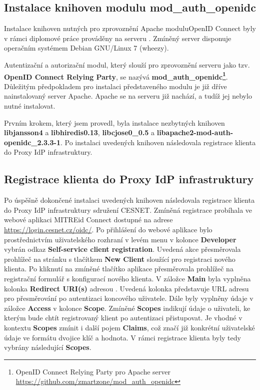 \documentclass[
  printed, %
  twoside, %
  table,   %
  nolof,     %
  nolot,     %
]{fithesis3}
\begin{document}
\label{apacheConfig}
\subsection{Instalace knihoven modulu mod\_auth\_openidc}
Instalace knihoven nutných pro zprovoznění Apache modulu\break OpenID Connect byly v rámci diplomové práce prováděny na serveru . Zmíněný server disponuje operačním systémem Debian GNU/Linux 7 (wheezy). 
\par 
Autentizační a autorizační modul, který slouží pro zprovoznění serveru jako tzv. \textbf{OpenID Connect Relying Party}, se nazývá \linebreak \textbf{mod\_auth\_openidc\footnote{OpenID Connect Relying Party pro Apache server \url{https://github.com/zmartzone/mod\_auth\_openidc}}}. Důležitým předpokladem pro instalaci představeného modulu je již dříve nainstalovaný server Apache. Apache se na serveru  již nachází, a tudíž jej nebylo nutné instalovat. 
\par 
Prvním krokem, který jsem provedl, byla instalace nezbytných knihoven \textbf{libjansson4} a \textbf{libhiredis0.13}, \textbf{libcjose0\_0.5} a \textbf{libapache2-mod-auth-openidc\_2.3.3-1}. Po instalaci uvedených knihoven následovala registrace klienta do Proxy IdP infrastruktury. 

\subsection{Registrace klienta do Proxy IdP infrastruktury}

Po úspěšně dokončené instalaci uvedených knihoven následovala registrace klienta  do Proxy IdP infrastruktury sdružení CESNET. Zmíněná registrace probíhala ve webové aplikaci MITREid Connect dostupné na adrese \url{https://login.cesnet.cz/oidc/}. Po přihlášení do webové aplikace bylo prostřednictvím uživatelského rozhraní v levém menu v kolonce \textbf{Developer} vybrán odkaz \textbf{Self-service client registration}. Uvedená akce přesměrovala prohlížeč na stránku s tlačítkem \textbf{New Client} sloužící pro registraci nového klienta. Po kliknutí na zmíněné tlačítko aplikace přesměrovala prohlížeč na registrační formulář s konfigurací nového klienta. V záložce \textbf{Main} byla vyplněna kolonka \textbf{Redirect URI(s)} adresou . Uvedená kolonka představuje URL adresu pro přesměrování po autentizaci koncového uživatele. Dále byly vyplněny údaje v záložce \textbf{Access} v kolonce \textbf{Scope}. Zmíněné \textbf{Scopes} indikují údaje o uživateli, ke kterým bude chtít registrovaný klient po autentizaci přistupovat. Je vhodné v kontextu \textbf{Scopes} zmínit i další pojem \textbf{Claims}, což značí již konkrétní uživatelské údaje ve formátu dvojice klíč a hodnota. V rámci registrace klienta byly tedy vybrány následující \textbf{Scopes}.
\end{document}
